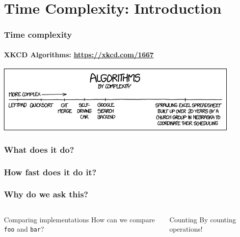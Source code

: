 \section{Time Complexity: Introduction}\label{sec:time_complexity_introduction}

\begin{frame}
	\frametitle{Time complexity}
	\framesubtitle{XKCD Algorithms: \url{https://xkcd.com/1667}}
	
	\begin{center}
		\includegraphics[width=0.9\textwidth]{figures/algorithms.png}
	\end{center}
\end{frame}


\begin{frame}
	\frametitle<-3>{What does it do?}
	\frametitle<4->{How fast does it do it?}

	\begin{overlayarea}{\textwidth}{\textheight}
		
		\pause
	\end{overlayarea}
\end{frame}

\begin{frame}
	\frametitle{Why do we ask this?}

	\begin{columns}
			
			
		\pause
		\begin{questionblock}{Comparing implementations}
			How can we compare \texttt{foo} and \texttt{bar}?
		\end{questionblock}
		\pause
		\begin{answerblock}{Counting}
			By counting operations!
		\end{answerblock}
	\end{columns}
\end{frame}

